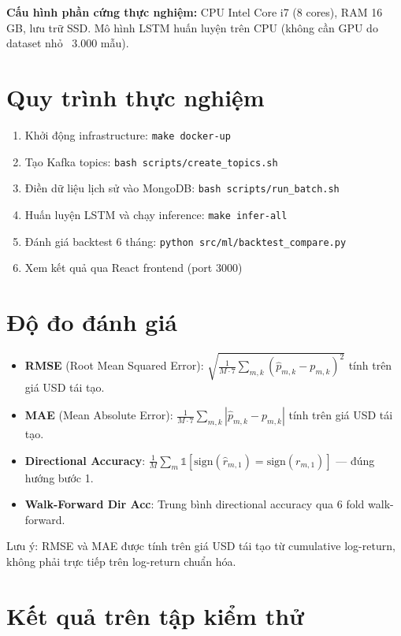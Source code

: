 \documentclass[12pt, a4paper]{report}
\begin{document}
\textbf{Cấu hình phần cứng thực nghiệm:} CPU Intel Core i7 (8 cores), RAM 16 GB,
lưu trữ SSD. Mô hình LSTM huấn luyện trên CPU (không cần GPU do dataset nhỏ ~3.000 mẫu).

\section{Quy trình thực nghiệm}

\begin{enumerate}
  \item Khởi động infrastructure: \texttt{make docker-up}
  \item Tạo Kafka topics: \texttt{bash scripts/create\_topics.sh}
  \item Điền dữ liệu lịch sử vào MongoDB: \texttt{bash scripts/run\_batch.sh}
  \item Huấn luyện LSTM và chạy inference: \texttt{make infer-all}
  \item Đánh giá backtest 6 tháng: \texttt{python src/ml/backtest\_compare.py}
  \item Xem kết quả qua React frontend (port 3000)
\end{enumerate}

\section{Độ đo đánh giá}

\begin{itemize}
  \item \textbf{RMSE} (Root Mean Squared Error): $\sqrt{\frac{1}{M \cdot 7}\sum_{m,k}(\hat{p}_{m,k} - p_{m,k})^2}$ tính trên giá USD tái tạo.
  \item \textbf{MAE} (Mean Absolute Error): $\frac{1}{M \cdot 7}\sum_{m,k}|\hat{p}_{m,k} - p_{m,k}|$ tính trên giá USD tái tạo.
  \item \textbf{Directional Accuracy}: $\frac{1}{M}\sum_m \mathbb{1}[\text{sign}(\hat{r}_{m,1}) = \text{sign}(r_{m,1})]$ --- đúng hướng bước 1.
  \item \textbf{Walk-Forward Dir Acc}: Trung bình directional accuracy qua 6 fold walk-forward.
\end{itemize}

Lưu ý: RMSE và MAE được tính trên giá USD tái tạo từ cumulative log-return, không phải
trực tiếp trên log-return chuẩn hóa.

\section{Kết quả trên tập kiểm thử}
\end{document}
